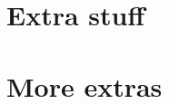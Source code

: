 \appendix                 %
\cleardoublepage          %
{}


\chapter{Extra stuff}

\chapter{More extras}